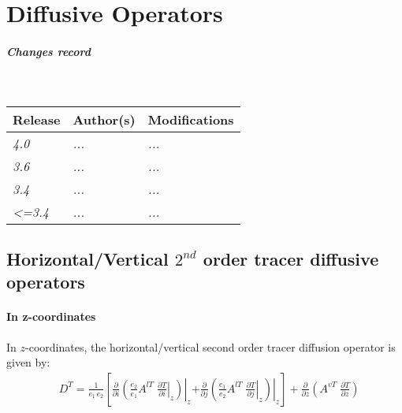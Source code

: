 \documentclass[../main/NEMO_manual]{subfiles}
\begin{document}
\chapter{Diffusive Operators}
\label{apdx:DIFFOPERS}

\chaptertoc

\paragraph{Changes record} ~\\

{\footnotesize
  \begin{tabularx}{\textwidth}{l||X|X}
    Release & Author(s) & Modifications \\
    \hline
    {\em   4.0} & {\em ...} & {\em ...} \\
    {\em   3.6} & {\em ...} & {\em ...} \\
    {\em   3.4} & {\em ...} & {\em ...} \\
    {\em <=3.4} & {\em ...} & {\em ...}
  \end{tabularx}
}

\clearpage

\section{Horizontal/Vertical $2^{nd}$ order tracer diffusive operators}
\label{sec:DIFFOPERS_1}

\subsubsection*{In z-coordinates}

In $z$-coordinates, the horizontal/vertical second order tracer diffusion operator is given by:
\begin{align}
  \label{eq:DIFFOPERS_1}
  &D^T = \frac{1}{e_1 \, e_2}      \left[
    \left. \frac{\partial}{\partial i} \left( 	\frac{e_2}{e_1}A^{lT} \;\left. \frac{\partial T}{\partial i} \right|_z   \right)   \right|_z      \right.
    \left.
    + \left. \frac{\partial}{\partial j} \left(  \frac{e_1}{e_2}A^{lT} \;\left. \frac{\partial T}{\partial j} \right|_z   \right)   \right|_z      \right]
    + \frac{\partial }{\partial z}\left( {A^{vT} \;\frac{\partial T}{\partial z}} \right)
\end{align}
\end{document}
